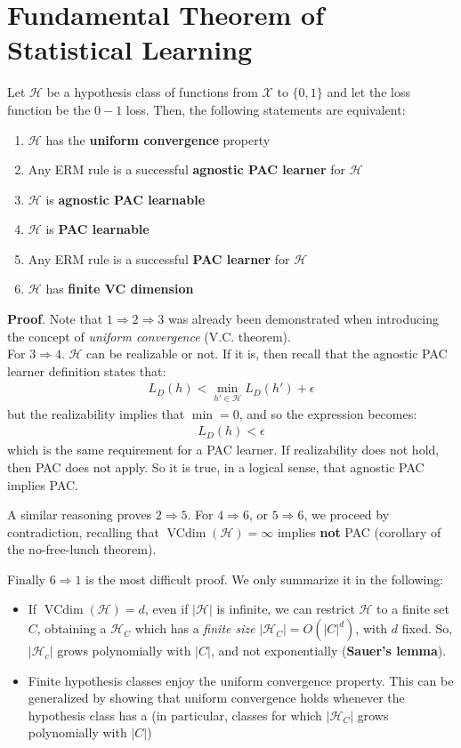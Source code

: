 \documentclass[../template.tex]{subfiles}
\begin{document}
\section{Fundamental Theorem of Statistical Learning}
Let $\mathcal{H}$ be a hypothesis class of functions from $\mathcal{X}$ to $\{0,1\}$ and let the loss function be the $0-1$ loss. Then, the following statements are equivalent:
\begin{enumerate}
    \item $\mathcal{H}$ has the \textbf{uniform convergence} property
    \item Any ERM rule is a successful \textbf{agnostic PAC learner} for $\mathcal{H}$
    \item $\mathcal{H}$ is \textbf{agnostic PAC learnable}
    \item $\mathcal{H}$ is \textbf{PAC learnable}
    \item Any ERM rule is a successful \textbf{PAC learner} for $\mathcal{H}$
    \item $\mathcal{H}$ has \textbf{finite VC dimension}            
\end{enumerate}

\textbf{Proof}. Note that $1 \Rightarrow 2 \Rightarrow 3$ was already been demonstrated when introducing the concept of \textit{uniform convergence} (V.C. theorem).\\
For $3 \Rightarrow 4$. $\mathcal{H}$ can be realizable or not. If it is, then recall that the agnostic PAC learner definition states that:
\begin{align*}
    L_D(h) < \min_{h' \in \mathcal{H}} L_D(h') + \epsilon
\end{align*}   
but the realizability implies that $\min = 0$, and so the expression becomes:
\begin{align*}
    L_D(h) < \epsilon
\end{align*} 
which is the same requirement for a PAC learner. 
If realizability does not hold, then PAC does not apply. So it is true, in a logical sense, that agnostic PAC implies PAC.

A similar reasoning proves $2 \Rightarrow 5$. For $4 \Rightarrow 6$, or $5 \Rightarrow 6$, we proceed by contradiction, recalling that $\operatorname{VCdim}(\mathcal{H}) = \infty $ implies \textbf{not} PAC (corollary of the no-free-lunch theorem).

Finally $6 \Rightarrow 1$ is the most difficult proof. We only summarize it in the following:
\begin{itemize}
    \item If $\operatorname{VCdim}(\mathcal{H}) = d$, even if $|\mathcal{H}|$ is infinite, we can restrict $\mathcal{H}$ to a finite set $C$, obtaining a $\mathcal{H}_C$ which has a \textit{finite size} $|\mathcal{H}_C| = O(|C|^d)$, with $d$ fixed. So, $|\mathcal{H}_c|$ grows polynomially with $|C|$, and not exponentially (\textbf{Sauer's lemma}).
    \item Finite hypothesis classes enjoy the uniform convergence property. This can be generalized by showing that uniform convergence holds whenever the hypothesis class has a  (in particular, classes for which $|\mathcal{H}_C|$ grows polynomially with $|C|$)          
\end{itemize}
\end{document}
